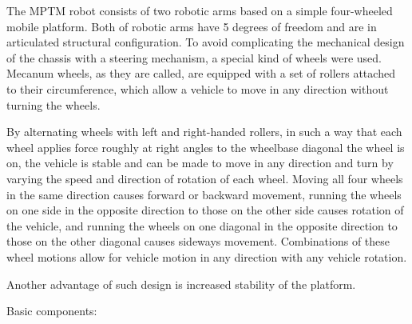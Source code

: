 The MPTM robot consists of two robotic arms based on a simple four-wheeled mobile platform. Both of robotic arms have 5 degrees of freedom and are in articulated structural configuration. To avoid complicating the mechanical design of the chassis with a steering mechanism, a special kind of wheels were used. Mecanum wheels, as they are called, are equipped with a set of rollers attached to their circumference, which allow a vehicle to move in any direction without turning the wheels. 

By alternating wheels with left and right-handed rollers, in such a way that each wheel applies force roughly at right angles to the wheelbase diagonal the wheel is on, the vehicle is stable and can be made to move in any direction and turn by varying the speed and direction of rotation of each wheel. Moving all four wheels in the same direction causes forward or backward movement, running the wheels on one side in the opposite direction to those on the other side causes rotation of the vehicle, and running the wheels on one diagonal in the opposite direction to those on the other diagonal causes sideways movement. Combinations of these wheel motions allow for vehicle motion in any direction with any vehicle rotation.

Another advantage of such design is increased stability of the platform.

Basic components:

